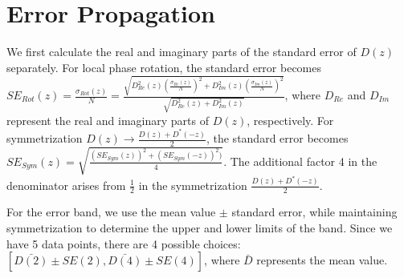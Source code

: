 \documentclass[aps,prd,twocolumn,tightenlines,superscriptaddress,
nofootinbib,preprintnumbers]{revtex4-1}
\begin{document}
\section{Error Propagation}

We first calculate the real and imaginary parts of the standard error of $D(z)$ separately. For local phase rotation, the standard error becomes $SE_{Rot}(z) = \frac{\sigma_{Rot}(z)}{N} = \frac{\sqrt{D^2_{Re}(z)(\frac{\sigma_{Re}(z)}{N})^2+D^2_{Im}(z)(\frac{\sigma_{Im}(z)}{N})^2}}{\sqrt{D^2_{Re}(z)+D^2_{Im}(z)} }$, where $D_{Re}$ and $D_{Im}$ represent the real and imaginary parts of $D(z)$, respectively. For symmetrization $D(z)\to \frac{D(z)+D^*(-z)}{2} $, the standard error becomes $SE_{Sym}(z) = \sqrt{\frac{(SE_{Sym}(z))^2+(SE_{Sym}(-z))^2)}{4} }$. The additional factor 4 in the denominator arises from $\frac{1}{2}$ in the symmetrization $\frac{D(z)+D^*(-z)}{2}$.

For the error band, we use the mean value $\pm$ standard error, while maintaining symmetrization to determine the upper and lower limits of the band. Since we have 5 data points, there are 4 possible choices: $[\bar{D(2)}\pm SE(2), \bar{D(4)}\pm SE(4)]$, where $\bar{D}$ represents the mean value.

\fi



\end{document}
